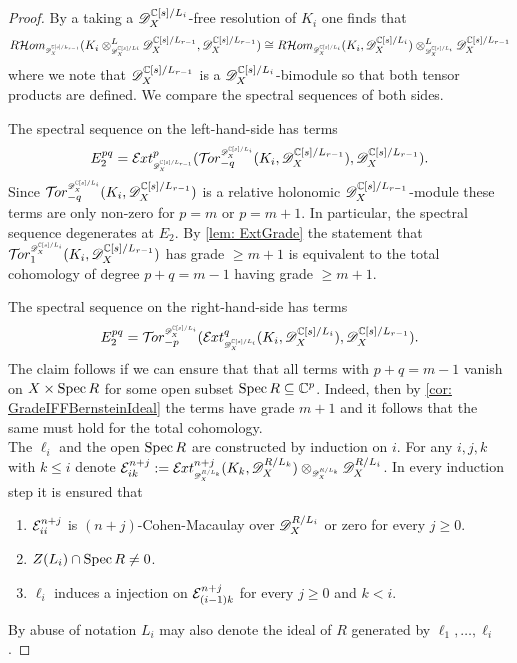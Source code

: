 \begin{proof}
  By a taking a $\mathscr{D}_{X}^{\mathbb{C}[s]/L_{i}}$-free resolution of $K_i$ one finds that
  $$R \Hom_{\scaleto{\D_\X^{ \C[s]/L_{r-1} }}{8pt} }(K_i\otimes^L_{\scaleto{ \D_\X^{\C[s]/L{i}} }{8pt} } \D_\X^{\C[s]/L_{r-1} },\D_\X^{ \C[s]/L_{r-1}} ) \cong R \Hom_{ \scaleto{\D_\X^{\C[s]/L_{i}}}{8pt} } (K_i,\D_\X^{\C[s]/L_{i}}) \otimes^L_{\scaleto{ \D_\X^{\C[s]/L_{i}}}{8pt} } \D_\X^{\C[s]/L_{r-1}}$$
  where we note that $\mathscr{D}_X^{\mathbb{C}[s]/L_{r-1}}$ is a $\mathscr{D}_X^{\mathbb{C}[s]/L_{i}}$-bimodule so that both tensor products are defined.
  We compare the spectral sequences of both sides.

  The spectral sequence on the left-hand-side has terms
  $$E^{pq}_2 = \Ex{\D_\X^{\C[s]/L_{r-1}}}{p}(\Tr{\D_\X^{\C[s]/L_{i}} }{-q}(K_i,\D_X^{\C[s]/L_{r-1}}),\D_\X^{\C[s]/L_{r-1}}).$$
  Since $\Tr{\D_\X^{\C[s]/L_{i}} }{-q}(K_i,\D_X^{\C[s]/L_{r-1}})$ is a relative holonomic $\mathscr{D}_X^{\mathbb{C}[s]/L_{r-1}}$-module these terms are only non-zero for $p=m$ or $p = m+1$.
  In particular, the spectral sequence degenerates at $E_2$.
  By \cref{lem: ExtGrade} the statement that $\Tr{\D_\X^{\C[s]/L_i}}{1}(K_i, \D_\X^{\C[s]/L_{r-1}})$ has grade $\geq m+1$ is equivalent to the total cohomology of degree $p + q = m-1$ having grade $\geq m+1$.

  The spectral sequence on the right-hand-side has terms
  $$E_2^{pq} = \Tr{\D_\X^{\C[s]/L_{i}} }{-p}(\Ex{ \D_\X^{\C[s]/L_{i}} }{q} (K_i,\D_\X^{\C[s]/L_{i}}), \D_\X^{\C[s]/L_{r-1}}).$$
  The claim follows if we can ensure that that all terms with $p+q = m -1$ vanish on $X\times\operatorname{Spec} R$ for some open subset $\operatorname{Spec} R\subseteq \mathbb{C}^p$.
  Indeed, then by \cref{cor: GradeIFFBernsteinIdeal} the terms have grade $m+1$ and it follows that the same must hold for the total cohomology.
  \\

  The $\ell_i$ and the open $\operatorname{Spec} R$ are constructed by induction on $i$. For any $i,j,k$ with $k\leq i$ denote $\E_{ik}^{n+j}:= \Ex{\D_\X^{R/L_{k}} }{n+j}(K_k, \D_\X^{R/L_k}) \otimes_{\scaleto{\D_\X^{R/L_{k}}}{8pt}} \D_\X^{R/L_{i}}$.
  In every induction step it is ensured that
  \begin{enumerate}[label=(\roman*)]
    \item $\mathcal{E}_{ii}^{n+j}$ is $(n+j)$-Cohen-Macaulay over $\mathscr{D}_X^{R/L_i}$ or zero for every $j\geq 0$.
    \item $Z(L_i)\cap \operatorname{Spec} R \neq 0$.
    \item $\ell_i$ induces a injection on $\mathcal{E}_{(i-1)k}^{n+j}$
    for every $j\geq 0$ and $k<i$.
  \end{enumerate}
  By abuse of notation $L_i$ may also denote the ideal of $R$ generated by $\ell_1,\ldots,\ell_i$.


\end{proof}
